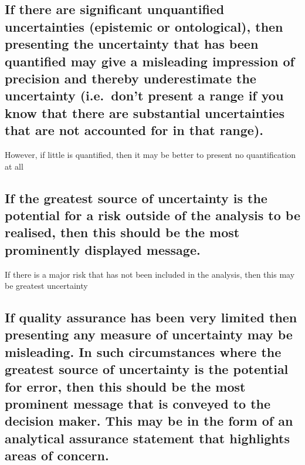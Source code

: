 \documentclass[]{book}
\begin{document}
\subsection{If there are significant unquantified uncertainties
(epistemic or ontological), then presenting the uncertainty that has
been quantified may give a misleading impression of precision and
thereby underestimate the uncertainty (i.e.~don't present a range if you
know that there are substantial uncertainties that are not accounted for
in that
range).}\label{if-there-are-significant-unquantified-uncertainties-epistemic-or-ontological-then-presenting-the-uncertainty-that-has-been-quantified-may-give-a-misleading-impression-of-precision-and-thereby-underestimate-the-uncertainty-i.e.dont-present-a-range-if-you-know-that-there-are-substantial-uncertainties-that-are-not-accounted-for-in-that-range.}

 However, if little is quantified, then it may be better to present no
quantification at all

\subsection{If the greatest source of uncertainty is the potential for a
risk outside of the analysis to be realised, then this should be the
most prominently displayed
message.}\label{if-the-greatest-source-of-uncertainty-is-the-potential-for-a-risk-outside-of-the-analysis-to-be-realised-then-this-should-be-the-most-prominently-displayed-message.}

 If there is a major risk that has not been included in the analysis,
then this may be greatest uncertainty

\subsection{If quality assurance has been very limited then presenting
any measure of uncertainty may be misleading. In such circumstances
where the greatest source of uncertainty is the potential for error,
then this should be the most prominent message that is conveyed to the
decision maker. This may be in the form of an analytical assurance
statement that highlights areas of
concern.}\label{if-quality-assurance-has-been-very-limited-then-presenting-any-measure-of-uncertainty-may-be-misleading.-in-such-circumstances-where-the-greatest-source-of-uncertainty-is-the-potential-for-error-then-this-should-be-the-most-prominent-message-that-is-conveyed-to-the-decision-maker.-this-may-be-in-the-form-of-an-analytical-assurance-statement-that-highlights-areas-of-concern.}
\end{document}

